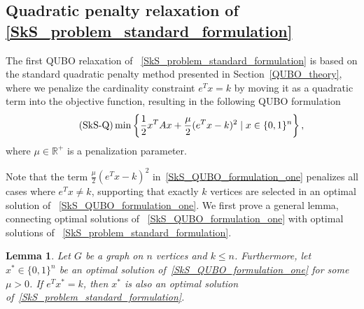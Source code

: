 \documentclass{article}
\newtheorem{lem}[thm]{Lemma}
\begin{document}
\subsection{Quadratic penalty relaxation  of \ref{SkS_problem_standard_formulation}}\label{section_SkS_QUBO_exact_penalty}

The first QUBO relaxation of ~\eqref{SkS_problem_standard_formulation} is based on the standard quadratic penalty method presented in Section~\ref{QUBO_theory}, where we penalize the cardinality constraint $e^Tx = k$ by moving it as a quadratic term into the objective function, resulting in the following QUBO formulation
\begin{align}\label{SkS_QUBO_formulation_one}
\tag{\mbox{SkS-Q}}
     \min \left\{\frac{1}{2}x^TAx + \frac{\mu}{2}(e^Tx - k)^2 \mid x \in \{0, 1\}^n \right\},
\end{align}
where $\mu \in \mathbb{R}^+$ is a  penalization parameter.

Note that the term $\frac{\mu}{2}(e^Tx - k)^2$ in~\eqref{SkS_QUBO_formulation_one} penalizes all cases where $e^Tx \neq k$, supporting that exactly $k$ vertices are selected in an optimal solution of ~\eqref{SkS_QUBO_formulation_one}. 
We first prove a general lemma, connecting optimal solutions of ~\eqref{SkS_QUBO_formulation_one} with optimal solutions of ~\eqref{SkS_problem_standard_formulation}.\\

\begin{lem}
\label{lem:optimality_test_QUBO}
Let $G$ be a graph on $n$ vertices and $k \leq n$. Furthermore, let $x^* \in \{0,1\}^n$ be an optimal solution of~\eqref{SkS_QUBO_formulation_one} for some $\mu > 0$. If $e^T x^* = k$, then $x^*$ is also an optimal solution of~\eqref{SkS_problem_standard_formulation}.
\end{lem}
\end{document}
